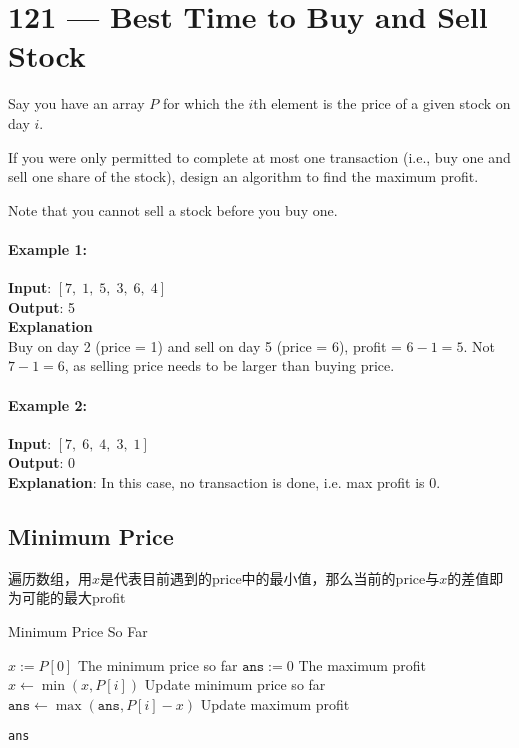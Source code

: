 \section{121 --- Best Time to Buy and Sell Stock}
Say you have an array $P$ for which the $i$th element is the price of a given stock on day $i$.
\par
If you were only permitted to complete at most one transaction (i.e., buy one and sell one share of the stock), design an algorithm to find the maximum profit.
\par
Note that you cannot sell a stock before you buy one.
\paragraph{Example 1:}
\begin{flushleft}
\textbf{Input}: $[7,\;1,\;5,\;3,\;6,\;4]$
\\
\textbf{Output}: 5
\\
\textbf{Explanation}
\\
Buy on day 2 (price = 1) and sell on day 5 (price = 6), profit = $6-1 = 5$. Not $7-1 = 6$, as selling price needs to be larger than buying price.
\end{flushleft}
\paragraph{Example 2:}
\begin{flushleft}
\textbf{Input}: $[7,\;6,\;4,\;3,\;1]$
\\
\textbf{Output}: 0
\\
\textbf{Explanation}: In this case, no transaction is done, i.e. max profit is 0.
\end{flushleft}
\subsection{Minimum Price}
\begin{CJK*}{UTF8}{gbsn}
遍历数组，用$x$是代表目前遇到的price中的最小值，那么当前的price与$x$的差值即为可能的最大profit
\end{CJK*}
\setcounter{algorithm}{0}
\begin{algorithm}[H]
\caption{Minimum Price So Far}
\begin{algorithmic}[1]
\State {}
\EndIf
\State $x:=P[0]$ \Comment The minimum price so far
\State $\texttt{ans}:=0$ \Comment The maximum profit
\State $x\gets \min(x, P[i])$ \Comment Update minimum price so far
\State $\texttt{ans}\gets \max(\texttt{ans}, P[i] - x)$ \Comment Update maximum profit
\end{algorithmic}
\end{algorithm}
\begin{algorithm}[H]
\begin{algorithmic}[1]
\EndFor
\State \Return \texttt{ans}
\EndProcedure
\end{algorithmic}
\end{algorithm}
